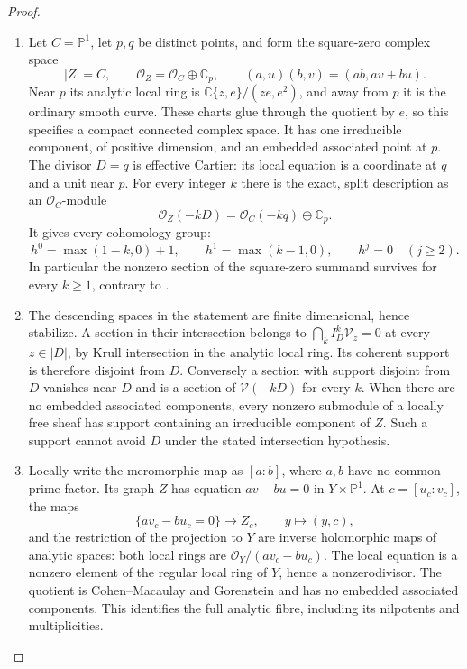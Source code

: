 \begin{proof}

\begin{enumerate}[label=\arabic*.,leftmargin=*]
\item Let $C=\mathbb P^1$, let $p,q$ be distinct points, and form the
square-zero complex space
\[
 |Z|=C,\qquad\mathcal O_Z=\mathcal O_C\oplus\mathbb C_p,
 \qquad(a,u)(b,v)=(ab,av+bu).
\]
Near $p$ its analytic local ring is
$\mathbb C\{z,e\}/(ze,e^2)$, and away from $p$ it is the
ordinary smooth curve. These charts glue through the quotient
by $e$, so this specifies a compact connected complex space.
It has one irreducible component, of positive dimension, and an
embedded associated point at $p$. The divisor $D=q$ is effective
Cartier: its local equation is a coordinate at $q$ and a unit
near $p$. For every integer $k$ there is the exact, split
description as an $\mathcal O_C$-module
\[
 \mathcal O_Z(-kD)=\mathcal O_C(-kq)\oplus\mathbb C_p.
\]
It gives every cohomology group:
\[
 h^0=\max(1-k,0)+1,\qquad h^1=\max(k-1,0),\qquad
 h^j=0\quad(j\geq2).
\]
In particular the nonzero section of the square-zero summand
survives for every $k\geq1$, contrary to
\citet[Proposition~1.1, p.~78]{CDP98}.

\item The descending spaces in the statement are
finite dimensional, hence stabilize. A section in their
intersection belongs to $\bigcap_k I_D^k\mathcal V_z=0$ at
every $z\in|D|$, by Krull intersection in the analytic local
ring. Its coherent support is therefore disjoint from $D$.
Conversely a section with support disjoint from $D$ vanishes
near $D$ and is a section of $\mathcal V(-kD)$ for every $k$.
When there are no
embedded associated components, every nonzero submodule of a
locally free sheaf has support containing an irreducible
component of $Z$. Such a support cannot avoid $D$ under the
stated intersection hypothesis.

\item Locally write the meromorphic map as $[a:b]$, where $a,b$ have
no common prime factor. Its graph $Z$ has equation
$av-bu=0$ in $Y\times\mathbb P^1$. At $c=[u_c:v_c]$, the maps
\[
 \{av_c-bu_c=0\}\longrightarrow Z_c,\qquad y\longmapsto(y,c),
\]
and the restriction of the projection to $Y$ are inverse holomorphic
maps of analytic spaces: both local rings are
$\mathcal O_Y/(av_c-bu_c)$. The local equation is a nonzero
element of the regular local ring of $Y$, hence a nonzerodivisor.
The quotient is Cohen--Macaulay and Gorenstein and has no embedded
associated components. This identifies the full analytic fibre,
including its nilpotents and multiplicities.

\end{enumerate}
\end{proof}